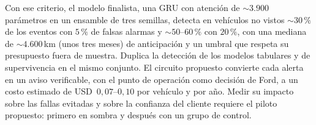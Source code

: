 Con ese criterio, el modelo finalista, una GRU con atención de $\sim 3.900$ parámetros en un ensamble de tres semillas,
detecta en vehículos no vistos $\sim 30\,\%$ de los eventos con $5\,\%$ de falsas alarmas y $\sim 50$--$60\,\%$ con $20\,\%$,
con una mediana de $\sim 4.600$\,km (unos tres meses) de anticipación y un umbral que respeta su presupuesto fuera de
muestra. Duplica la detección de los modelos tabulares y de supervivencia en el mismo conjunto. El circuito propuesto
convierte cada alerta en un aviso verificable, con el punto de operación como decisión de Ford, a un costo estimado de
USD~$0{,}07$--$0{,}10$ por vehículo y por año. Medir su impacto sobre las fallas evitadas y sobre la confianza del cliente
requiere el piloto propuesto: primero en sombra y después con un grupo de control.
